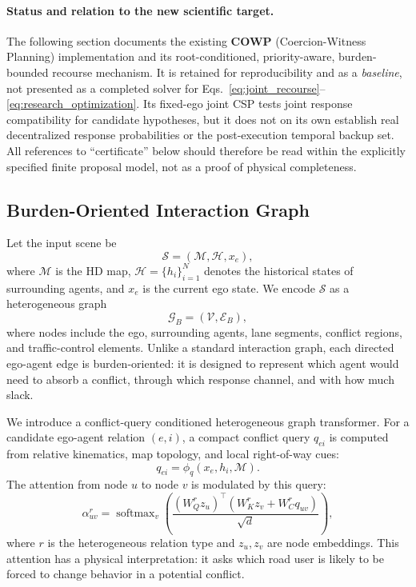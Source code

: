 \documentclass[10pt]{article}
\begin{document}
\paragraph{Status and relation to the new scientific target.}
The following section documents the existing \textbf{COWP} (Coercion-Witness Planning) implementation and its root-conditioned, priority-aware, burden-bounded recourse mechanism. It is retained for reproducibility and as a \emph{baseline}, not presented as a completed solver for Eqs.~\eqref{eq:joint_recourse}--\eqref{eq:research_optimization}. Its fixed-ego joint CSP tests joint response compatibility for candidate hypotheses, but it does not on its own establish real decentralized response probabilities or the post-execution temporal backup set. All references to ``certificate'' below should therefore be read within the explicitly specified finite proposal model, not as a proof of physical completeness.

\subsection{Burden-Oriented Interaction Graph}
\label{sec:method_graph}

Let the input scene be
\begin{equation}
    \mathcal{S} = (\mathcal{M}, \mathcal{H}, x_e),
\end{equation}
where $\mathcal{M}$ is the HD map, $\mathcal{H}=\{h_i\}_{i=1}^{N}$ denotes the historical states of surrounding agents, and $x_e$ is the current ego state. We encode $\mathcal{S}$ as a heterogeneous graph
\begin{equation}
    \mathcal{G}_B = (\mathcal{V}, \mathcal{E}_B),
\end{equation}
where nodes include the ego, surrounding agents, lane segments, conflict regions, and traffic-control elements. Unlike a standard interaction graph, each directed ego-agent edge is burden-oriented: it is designed to represent which agent would need to absorb a conflict, through which response channel, and with how much slack.

We introduce a conflict-query conditioned heterogeneous graph transformer. For a candidate ego-agent relation $(e,i)$, a compact conflict query $q_{ei}$ is computed from relative kinematics, map topology, and local right-of-way cues:
\begin{equation}
    q_{ei} = \phi_q(x_e, h_i, \mathcal{M}).
\end{equation}
The attention from node $u$ to node $v$ is modulated by this query:
\begin{equation}
    \alpha^{r}_{uv}
    =
    \operatorname{softmax}_{v}
    \left(
    \frac{
    (W^{r}_{Q} z_u)^\top
    (W^{r}_{K} z_v + W^{r}_{C} q_{uv})
    }{\sqrt{d}}
    \right),
\end{equation}
where $r$ is the heterogeneous relation type and $z_u,z_v$ are node embeddings. This attention has a physical interpretation: it asks which road user is likely to be forced to change behavior in a potential conflict.
\end{document}
